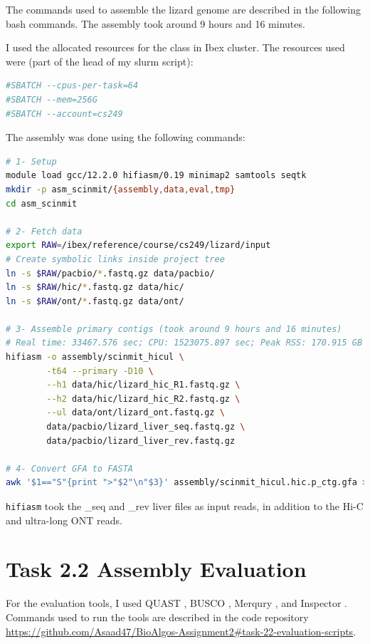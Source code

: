 \documentclass[12pt]{article}
\begin{document}
The commands used to assemble the lizard genome are described in the following bash commands. The assembly took around 9 hours and 16 minutes.

I used the allocated resources for the class in Ibex cluster. The resources used were (part of the head of my slurm script):

\begin{lstlisting}[language=bash]
#SBATCH --cpus-per-task=64
#SBATCH --mem=256G
#SBATCH --account=cs249
\end{lstlisting}

The assembly was done using the following commands:

\begin{lstlisting}[language=bash]
# 1- Setup
module load gcc/12.2.0 hifiasm/0.19 minimap2 samtools seqtk
mkdir -p asm_scinmit/{assembly,data,eval,tmp}
cd asm_scinmit

# 2- Fetch data
export RAW=/ibex/reference/course/cs249/lizard/input
# Create symbolic links inside project tree
ln -s $RAW/pacbio/*.fastq.gz data/pacbio/
ln -s $RAW/hic/*.fastq.gz data/hic/
ln -s $RAW/ont/*.fastq.gz data/ont/

# 3- Assemble primary contigs (took around 9 hours and 16 minutes)
# Real time: 33467.576 sec; CPU: 1523075.897 sec; Peak RSS: 170.915 GB
hifiasm -o assembly/scinmit_hicul \
        -t64 --primary -D10 \
        --h1 data/hic/lizard_hic_R1.fastq.gz \
        --h2 data/hic/lizard_hic_R2.fastq.gz \
        --ul data/ont/lizard_ont.fastq.gz \
        data/pacbio/lizard_liver_seq.fastq.gz \
        data/pacbio/lizard_liver_rev.fastq.gz

# 4- Convert GFA to FASTA
awk '$1=="S"{print ">"$2"\n"$3}' assembly/scinmit_hicul.hic.p_ctg.gfa > assembly/scinmit_hicul.hic.p_ctg.fa
\end{lstlisting}

\texttt{hifiasm} \cite{hifiasm} took the \_seq and \_rev liver files as input reads, in addition to the Hi-C and ultra-long ONT reads. 

\section{Task 2.2 Assembly Evaluation}

For the evaluation tools, I used QUAST \cite{quast}, BUSCO \cite{busco}, Merqury \cite{merqury}, and Inspector \cite{inspector}. 
Commands used to run the tools are described in the code repository \url{https://github.com/Asaad47/BioAlgos-Assignment2#task-22-evaluation-scripts}.
\end{document}
